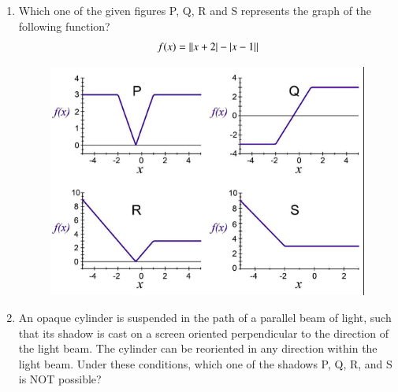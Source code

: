 \documentclass[journal,12pt,onecolumn]{IEEEtran}
\theoremstyle{remark}
\begin{document}
\begin{enumerate}[start=1, label=Q.\arabic*]
\hfill{}
\item Which one of the given figures P, Q, R and S represents the graph of the following function?
\[
f(x)=\left\vert\left\vert x+2\right\vert-\left\vert x-1\right\vert\right\vert
\]

\begin{figure}[H]
\centering
\includegraphics[width=0.9\columnwidth]{Figures/qu9.png} 
\caption{}
\end{figure}

\begin{enumerate}
\end{enumerate}

\hfill{}


\item An opaque cylinder is suspended in the path of a parallel beam of light, such that its shadow is cast on a screen oriented perpendicular to the direction of the light beam. The cylinder can be reoriented in any direction within the light beam. Under these conditions, which one of the shadows P, Q, R, and S is NOT possible?


\end{enumerate}
\end{document}
